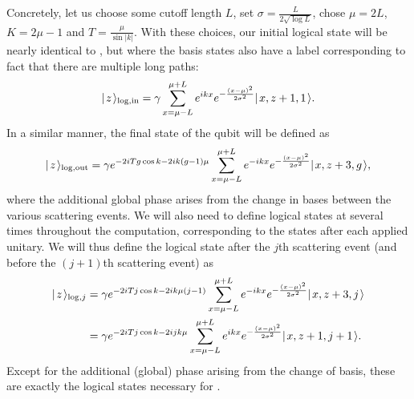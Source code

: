 \documentclass[../thesis-main/thesis-main]{subfiles}
\begin{document}
Concretely, let us choose some cutoff length $L$, set $\sigma = \frac{L}{2\sqrt{\log L}}$, chose $\mu = 2L$, $K = 2\mu-1$ and $T = \frac{\mu}{\sin |k|}$.  With these choices, our initial logical state will be nearly identical to , but where the basis states also have a label corresponding to fact that there are multiple long paths:
\begin{align}
  |\mspace{2mu} z \mspace{2mu} \rangle_{\text{log},\text{in}} = \gamma \sum_{x = \mu - L}^{\mu + L} e^{ i k x} e^{ - \frac{(x-\mu)^2}{2\sigma^2}} |\mspace{2mu} x,z+1,1 \mspace{2mu} \rangle.
\end{align}
In a similar manner, the final state of the qubit will be defined as
 \begin{align}
  |\mspace{2mu} z \mspace{2mu} \rangle_{\text{log},\text{out}} = \gamma e^{- 2 i Tg \cos k - 2 i k (g-1)\mu} \sum_{x = \mu - L}^{\mu + L} e^{ -i k x} e^{ - \frac{(x-\mu)^2}{2\sigma^2}} |\mspace{2mu} x,z+3,g \mspace{2mu} \rangle,
\end{align}
where the additional global phase arises from the change in bases between the various scattering events.  We will also need to define logical states at several times throughout the computation, corresponding to the states after each applied unitary.  We will thus define the logical state after the $j$th scattering event (and before the $(j+1)$th scattering event) as
\begin{align}
  |\mspace{2mu} z \mspace{2mu} \rangle_{\text{log},j} 
  &= \gamma e^{- 2 i Tj \cos k - 2 i k \mu (j-1)} \sum_{x = \mu - L}^{\mu + L} e^{ -i k x} e^{ - \frac{(x-\mu)^2}{2\sigma^2}} |\mspace{2mu} x,z+3,j \mspace{2mu} \rangle\\
  &= \gamma e^{-2i Tj \cos k - 2 i jk \mu}\sum_{x = \mu - L}^{\mu + L} e^{ i k x} e^{ - \frac{(x-\mu)^2}{2\sigma^2}} |\mspace{2mu} x,z+1,j+1 \mspace{2mu} \rangle.
\end{align}
Except for the additional (global) phase arising from the change of basis, these are exactly the logical states necessary for .
\end{document}
